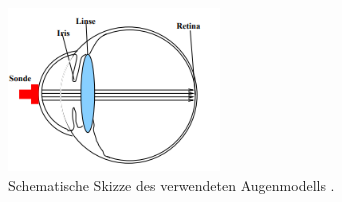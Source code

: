 \begin{figure}
    \centering
    \includegraphics[width=0.5\textwidth]{bilderlit/augeyo.png}
    \caption{Schematische Skizze des verwendeten Augenmodells \cite{skript}.} 
    \label{fig:augeyo}
\end{figure}
